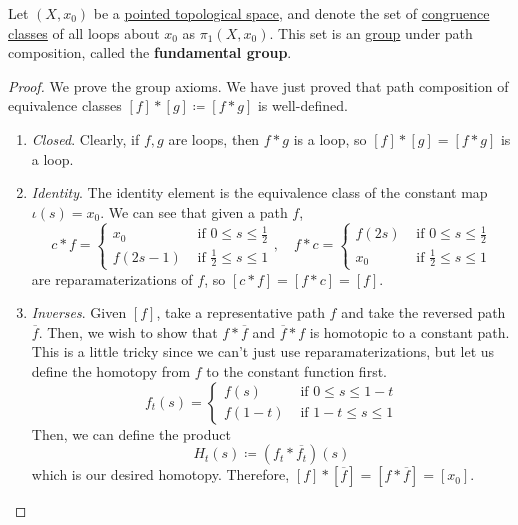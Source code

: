 	\begin{definition}
	  \label{def:fundamental-group}
		Let $(X, x_0)$ be a \hyperref[def:pointed-topological-space]{pointed topological space}, and denote the set of \hyperref[dg-def:congruence-classes]{congruence classes} of all loops about $x_0$ as $\pi_1 (X, x_0)$. This set is an \hyperref[alg-def:group]{group} under path composition, called the \textbf{fundamental group}. 
	\end{definition}
	\begin{proof}
		We prove the group axioms. We have just proved that path composition of equivalence classes $[f] \ast [g] \coloneqq [f \ast g]$ is well-defined.
		\begin{enumerate}
			\item \textit{Closed}. Clearly, if $f, g$ are loops, then $f \ast g$ is a loop, so $[f] \ast [g] = [f \ast g]$ is a loop.
			\item \textit{Identity}. The identity element is the equivalence class of the constant map $\iota(s) = x_0$. We can see that given a path $f$, 
				\begin{equation}
				  c \ast f = \begin{cases} 
						x_0 & \text{ if } 0 \leq s \leq \frac{1}{2} \\ 
						f(2s - 1) & \text{ if } \frac{1}{2} \leq s \leq 1
					\end{cases}, \quad f \ast c = \begin{cases} 
						f(2s) & \text{ if } 0 \leq s \leq \frac{1}{2} \\ 
						x_0  & \text{ if } \frac{1}{2} \leq s \leq 1
					\end{cases}
				\end{equation}
				are reparamaterizations of $f$, so $[c \ast f] = [f \ast c] = [f]$. 

			\item \textit{Inverses}. Given $[f]$, take a representative path $f$ and take the reversed path $\overline{f}$. Then, we wish to show that $f \ast \overline{f}$ and $\overline{f} \ast f$ is homotopic to a constant path. This is a little tricky since we can't just use reparamaterizations, but let us define the homotopy from $f$ to the constant function first. 
				\begin{equation}
					f_t (s) = \begin{cases} 
						f(s) & \text{ if } 0 \leq s \leq 1 - t \\ 
						f(1 - t) & \text{ if } 1 - t \leq s \leq 1
					\end{cases}
				\end{equation}
				Then, we can define the product 
				\begin{equation}
					H_t (s) \coloneqq (f_t \ast \overline{f_t}) (s)
				\end{equation} 
				which is our desired homotopy. Therefore, $[f] \ast [\overline{f}] = [f \ast \overline{f}] = [x_0]$. 


\end{enumerate}
\end{proof}

